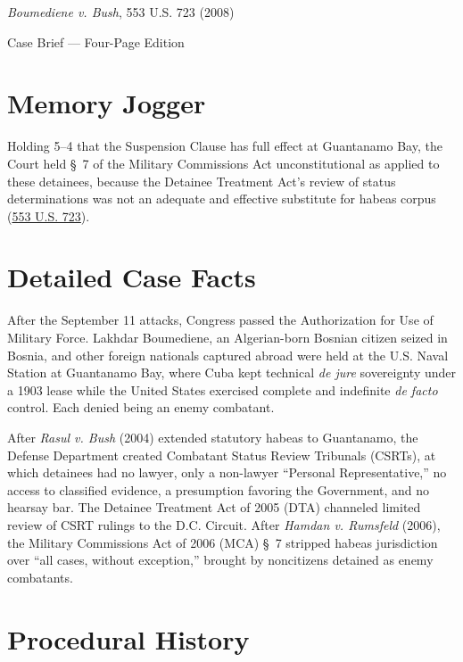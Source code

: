 \documentclass[12pt]{article}
\begin{document}
\begin{center}
{\LARGE \textit{Boumediene v. Bush}, 553 U.S. 723 (2008)\par}
\vspace{0.8em}
{\large Case Brief --- Four-Page Edition\par}
\end{center}
\vspace{1em}

\section{Memory Jogger}

Holding 5--4 that the Suspension Clause has full effect at Guantanamo Bay, the Court held \S~7 of the Military Commissions Act unconstitutional as applied to these detainees, because the Detainee Treatment Act's review of status determinations was not an adequate and effective substitute for habeas corpus (\href{https://supreme.justia.com/cases/federal/us/553/723/}{553 U.S. 723}).

\section{Detailed Case Facts}

After the September 11 attacks, Congress passed the Authorization for Use of Military Force. Lakhdar Boumediene, an Algerian-born Bosnian citizen seized in Bosnia, and other foreign nationals captured abroad were held at the U.S. Naval Station at Guantanamo Bay, where Cuba kept technical \textit{de jure} sovereignty under a 1903 lease while the United States exercised complete and indefinite \textit{de facto} control. Each denied being an enemy combatant.

After \textit{Rasul v. Bush} (2004) extended statutory habeas to Guantanamo, the Defense Department created Combatant Status Review Tribunals (CSRTs), at which detainees had no lawyer, only a non-lawyer ``Personal Representative,'' no access to classified evidence, a presumption favoring the Government, and no hearsay bar. The Detainee Treatment Act of 2005 (DTA) channeled limited review of CSRT rulings to the D.C. Circuit. After \textit{Hamdan v. Rumsfeld} (2006), the Military Commissions Act of 2006 (MCA) \S~7 stripped habeas jurisdiction over ``all cases, without exception,'' brought by noncitizens detained as enemy combatants.

\section{Procedural History}
\end{document}

